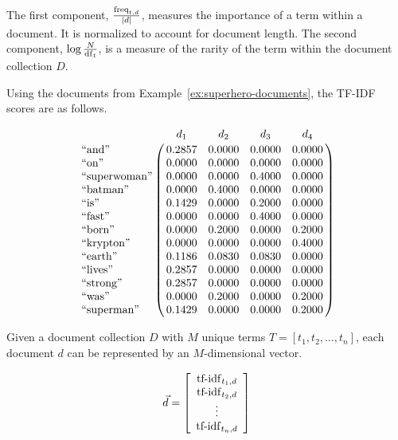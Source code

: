 		\begin{remark}
			The first component, $\frac{\operatorname{freq}_{t, d}}{\mid d \mid}$, measures the importance of a term within a document.  It is normalized to account for document length.  The second component, $\log{\frac{N}{\operatorname{df}_t}}$, is a measure of the rarity of the term within the document collection $D$.
		\end{remark}
		
		\begin{ex}
			Using the documents from Example~\ref{ex:superhero-documents}, the TF-IDF scores are as follows.
			
			$$\bordermatrix{
				~ & d_1 & d_2 & d_3 & d_4 \cr
				\textrm{``and''} & 0.2857 & 0.0000 & 0.0000 & 0.0000 \cr
				\textrm{``on''} & 0.0000 & 0.0000 & 0.0000 & 0.0000 \cr
				\textrm{``superwoman''} & 0.0000 & 0.0000 & 0.4000 & 0.0000 \cr
				\textrm{``batman''} & 0.0000 & 0.4000 & 0.0000 & 0.0000 \cr
				\textrm{``is''} & 0.1429 & 0.0000 & 0.2000 & 0.0000 \cr
				\textrm{``fast''} & 0.0000 & 0.0000 & 0.4000 & 0.0000 \cr
				\textrm{``born''} & 0.0000 & 0.2000 & 0.0000 & 0.2000 \cr
				\textrm{``krypton''} & 0.0000 & 0.0000 & 0.0000 & 0.4000 \cr
				\textrm{``earth''} & 0.1186 & 0.0830 & 0.0830 & 0.0000 \cr
				\textrm{``lives''} & 0.2857 & 0.0000 & 0.0000 & 0.0000 \cr
				\textrm{``strong''} & 0.2857 & 0.0000 & 0.0000 & 0.0000 \cr
				\textrm{``was''} & 0.0000 & 0.2000 & 0.0000 & 0.2000 \cr
				\textrm{``superman''} & 0.1429 & 0.0000 & 0.0000 & 0.2000 \cr
			}$$
		\end{ex}

		\begin{defn}
			Given a document collection $D$ with $M$ unique terms $T = \left[ t_1, t_2, \dotsc, t_n \right]$, each document $d$ can be represented by an $M$-dimensional vector.
			
			$$
				\vec{d} = 
				\left[
				\begin{array}{c}
					\operatorname{tf-idf}_{t_1, d} \\
					\operatorname{tf-idf}_{t_2, d} \\
					\vdots \\
					\operatorname{tf-idf}_{t_n, d}
				\end{array}
				\right]
			$$
		\end{defn}
		
